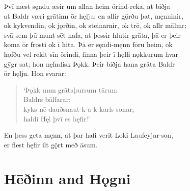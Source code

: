 \documentclass[12pt,letterpaper]{book}
\newcommand{\gap}[1][.25in]{\hspace{#1}}
\newcommand\emptypage{\clearpage{\pagestyle{empty}\cleardoublepage}}
\begin{document}
\begin{linenumbers}
Þvī næst sęndu æsir um allan heim örind-reka, at biðja\\
at Baldr væri grātinn ōr hęlju; en allir gǫ̈rðu þat, męnninir,\\
ok kykvendin, ok jǫrðin, ok steinarnir, ok trē, ok allr mālmr;\\
svā sem þū munt sēt hafa, at þessir hlutir grāta, þā er þeir\\
koma ōr frosti ok ī hita.  Þā er sęndi-męnn fōru heim, ok\\
hǫfðu vel rekit sīn örindi, finna þeir ī hęlli nǫkkurum hvar\\
gȳgr sat; hon nęfndisk Þǫkk.  Þeir biðja hana grāta Baldr\\
ōr hęlju.  Hon svarar:

\begin{verse}
   `Þǫkk mun grāta\gap þurrum tārum\\
    Baldrs bālfarar;\\
    kyks nē dauðs\gap naut-k-a-k karls sonar;\\
    haldi Hęl þvī es hęfir!'
\end{verse}

En þess geta męnn, at þar hafi verit Loki Laufeyjar-son,\\
er flest hęfir ilt gǫ̈rt með āsum.

\end{linenumbers}

\emptypage

\chapter{Hēðinn and Hǫgni}
\end{document}

